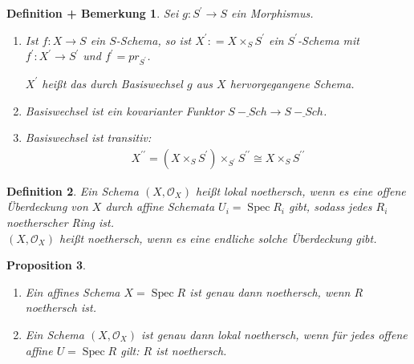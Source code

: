 \documentclass[a4paper,oneside]{scrbook}
\theoremstyle{break}
\newtheorem{Def}{Definition}[section]
\newtheorem{DefBem}[Def]{Definition + Bemerkung}
\newtheorem{Prop}[Def]{Proposition}
\theoremstyle{nonumberbreak}
\theoremstyle{nonumberplain}
\theoremstyle{break}
\newcommand{\defeqr}[0]{\mathrel{\mathop:}=}
\newcommand{\Spec}{%
	\ensuremath{\operatorname{Spec}}%
}
\begin{document}
\begin{DefBem}
  \label{defbem:5.4}
  Sei $g:S^\prime\to S$ ein Morphismus.
  \begin{enumerate}
  \item Ist $f:X\to S$ ein $S$-Schema, so ist $X^\prime\defeqr X\times_S S^\prime$ ein $S^\prime$-Schema mit
    $f^\prime:X^\prime\to S^\prime$ und $f^\prime=pr_{S^\prime}$. \\
    \begin{center}
    \end{center}
    $X^\prime$ heißt das durch \emph{Basiswechsel} $g$ aus $X$ hervorgegangene Schema.
  \item Basiswechsel ist ein kovarianter Funktor $\underline{S-Sch}\to \underline{S-Sch}$.
  \item Basiswechsel ist transitiv:
    \begin{align*}
      X^{\prime\prime}=(X\times_S S^\prime)\times_{S^\prime} S^{\prime\prime}\cong X\times_S S^{\prime\prime}
    \end{align*}
  \end{enumerate}
\end{DefBem}

\begin{Def}
  \label{def:5.5}
  Ein Schema $(X,\mathcal O_X)$ heißt \emph{lokal noethersch}, wenn es eine offene Überdeckung von $X$
  durch affine Schemata $U_i=\Spec R_i$ gibt, sodass jedes $R_i$ noetherscher Ring ist. \\
  $(X,\mathcal O_X)$ heißt \emph{noethersch}, wenn es eine endliche solche Überdeckung gibt.
\end{Def}

\begin{Prop}
  \label{prop:5.6}
  \begin{enumerate}
  \item Ein affines Schema $X=\Spec R$ ist genau dann noethersch, wenn $R$ noethersch ist.
  \item Ein Schema $(X,\mathcal O_X)$ ist genau dann lokal noethersch, wenn für jedes offene affine 
    $U=\Spec R$ gilt: $R$ ist noethersch.
  \end{enumerate}
\end{Prop}
\end{document}
